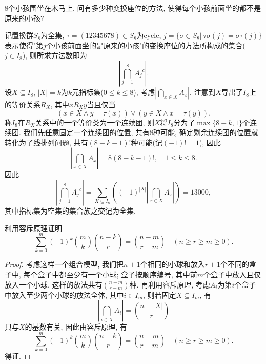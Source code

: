 \documentclass[chinese]{assignment}[2019/10/15]
\newcommand{\lr}[3]{\left#1#3\right#2}
\begin{document}
    \begin{problem}
        8个小孩围坐在木马上, 问有多少种变换座位的方法, 使得每个小孩前面坐的都不是原来的小孩?
    \end{problem}
    \begin{solution}
        记置换群$S_8$为全集, $\tau = (12345678)\in S_8$为cycle, $j=\{\sigma \in S_8\vert\ \tau\sigma(j)=\sigma\tau(j)\}$表示使得"第$j$个小孩前面坐的是原来的小孩"的变换座位的方法所构成的集合($j\in I_8$), 则所求方法数即为
        \begin{equation}
            \lr\vert\vert{\bigcap_{j=1}^8 {A_j}^c}.
        \end{equation}
        设$X\subseteq I_8$, $|X|=k$为$k$元指标集($0\leq k\leq 8$), 考虑$\lr\vert\vert{\bigcap_{x\in X}A_x}$. 注意到$X$导出了$I_8$上的等价关系$R_X$, 其中$xR_Xy$当且仅当
        \begin{equation}
            (x\in X \wedge y = \tau(x)) \vee (y\in X \wedge x = \tau(y)).
        \end{equation}
        称$I_8$在$R_X$关系中的一个等价类为一个连续团, 则$X$将$I_8$分为了$\max\{8-k, 1\}$个连续团. 我们先任意固定一个连续团的位置, 共有8种可能, 确定剩余连续团的位置就转化为了线排列问题, 共有$(8-k-1)!$种可能(记$(-1)!=1$), 因此
        \begin{equation}
            \lr\vert\vert{\bigcap_{x\in X}A_x} = 8(8-k-1)!,\quad 1\leq k\leq 8.
        \end{equation}
        因此
        \begin{equation}
            \lr\vert\vert{\bigcap_{j=1}^8 {A_j}^c} = \sum_{X\subseteq I_8}\lr(){(-1)^{|X|}\lr\vert\vert{\bigcap_{x\in X}A_x}} = 13000,
        \end{equation}
        其中指标集为空集的集合族之交记为全集.
    \end{solution}
    \begin{problem}
        利用容斥原理证明
        \begin{equation}
            \sum_{k=0}^m(-1)^k\binom mk \binom {n-k}r = \binom {n-m}{r-m}\quad(n\geq r\geq m\geq 0).
        \end{equation}
    \end{problem}
    \begin{proof}
        考虑这样一个组合模型, 我们把$n+1$个相同的小球和放入$r+1$个不同的盒子中, 每个盒子中都至少有一个小球; 盒子按顺序编号, 其中前$m$个盒子中放入且仅放入一个小球. 这样的放法共有$\binom {n-m}{r-m}$种. 再利用容斥原理, 考虑$A_i$为第$i$个盒子中放入至少两个小球的放法全体, 其中$i\in I_m$, 则若固定$X\subseteq I_m$, 有
        \begin{equation}
            \lr\vert\vert{\bigcap_{i\in X}A_i} = \binom {n-|X|}r
        \end{equation}
        只与$X$的基数有关, 因此由容斥原理, 有
                \begin{equation}
            \sum_{k=0}^m(-1)^k\binom mk \binom {n-k}r = \binom {n-m}{r-m}\quad(n\geq r\geq m\geq 0).
        \end{equation}
        得证.
    \end{proof}
\end{document}

